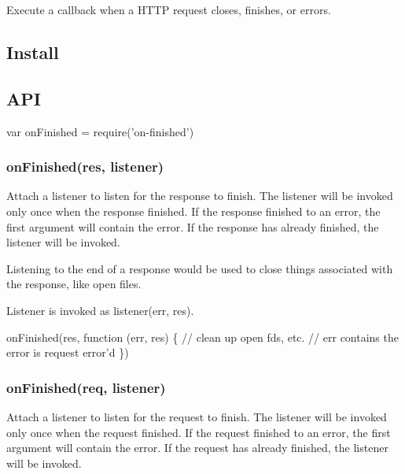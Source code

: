\href{https://npmjs.org/package/on-finished}{\tt } \href{https://npmjs.org/package/on-finished}{\tt } \href{http://nodejs.org/download/}{\tt } \href{https://travis-ci.org/jshttp/on-finished}{\tt } \href{https://coveralls.io/r/jshttp/on-finished?branch=master}{\tt }

Execute a callback when a H\+T\+TP request closes, finishes, or errors.

\subsection*{Install}




\subsection*{A\+PI}


\begin{DoxyCode}
var onFinished = require('on-finished')
\end{DoxyCode}


\subsubsection*{on\+Finished(res, listener)}

Attach a listener to listen for the response to finish. The listener will be invoked only once when the response finished. If the response finished to an error, the first argument will contain the error. If the response has already finished, the listener will be invoked.

Listening to the end of a response would be used to close things associated with the response, like open files.

Listener is invoked as {\ttfamily listener(err, res)}.


\begin{DoxyCode}
onFinished(res, function (err, res) \{
  // clean up open fds, etc.
  // err contains the error is request error'd
\})
\end{DoxyCode}


\subsubsection*{on\+Finished(req, listener)}

Attach a listener to listen for the request to finish. The listener will be invoked only once when the request finished. If the request finished to an error, the first argument will contain the error. If the request has already finished, the listener will be invoked.

